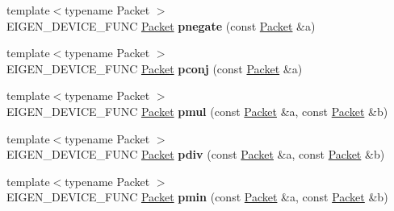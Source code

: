 \begin{DoxyCompactItemize}
{\footnotesize template$<$typename Packet $>$ }\\E\+I\+G\+E\+N\+\_\+\+D\+E\+V\+I\+C\+E\+\_\+\+F\+U\+NC \hyperlink{union_eigen_1_1internal_1_1_packet}{Packet} {\bfseries pnegate} (const \hyperlink{union_eigen_1_1internal_1_1_packet}{Packet} \&a)
\item 
\mbox{\label{namespace_eigen_1_1internal_a32b18e7146f8f3e1cfbe8477f44f00ef}} 
{\footnotesize template$<$typename Packet $>$ }\\E\+I\+G\+E\+N\+\_\+\+D\+E\+V\+I\+C\+E\+\_\+\+F\+U\+NC \hyperlink{union_eigen_1_1internal_1_1_packet}{Packet} {\bfseries pconj} (const \hyperlink{union_eigen_1_1internal_1_1_packet}{Packet} \&a)
\item 
\mbox{\label{namespace_eigen_1_1internal_a776f5f4b514ecaed2a98db928b8f745f}} 
{\footnotesize template$<$typename Packet $>$ }\\E\+I\+G\+E\+N\+\_\+\+D\+E\+V\+I\+C\+E\+\_\+\+F\+U\+NC \hyperlink{union_eigen_1_1internal_1_1_packet}{Packet} {\bfseries pmul} (const \hyperlink{union_eigen_1_1internal_1_1_packet}{Packet} \&a, const \hyperlink{union_eigen_1_1internal_1_1_packet}{Packet} \&b)
\item 
\mbox{\label{namespace_eigen_1_1internal_a462e918f3381d435028a0decd5485844}} 
{\footnotesize template$<$typename Packet $>$ }\\E\+I\+G\+E\+N\+\_\+\+D\+E\+V\+I\+C\+E\+\_\+\+F\+U\+NC \hyperlink{union_eigen_1_1internal_1_1_packet}{Packet} {\bfseries pdiv} (const \hyperlink{union_eigen_1_1internal_1_1_packet}{Packet} \&a, const \hyperlink{union_eigen_1_1internal_1_1_packet}{Packet} \&b)
\item 
\mbox{\label{namespace_eigen_1_1internal_a7963a08a4667f2c17320ca8c82b8571d}} 
{\footnotesize template$<$typename Packet $>$ }\\E\+I\+G\+E\+N\+\_\+\+D\+E\+V\+I\+C\+E\+\_\+\+F\+U\+NC \hyperlink{union_eigen_1_1internal_1_1_packet}{Packet} {\bfseries pmin} (const \hyperlink{union_eigen_1_1internal_1_1_packet}{Packet} \&a, const \hyperlink{union_eigen_1_1internal_1_1_packet}{Packet} \&b)
\item 
\mbox{\label{namespace_eigen_1_1internal_a5b48179611579b41066884b064345c60}} 

\end{DoxyCompactItemize}
